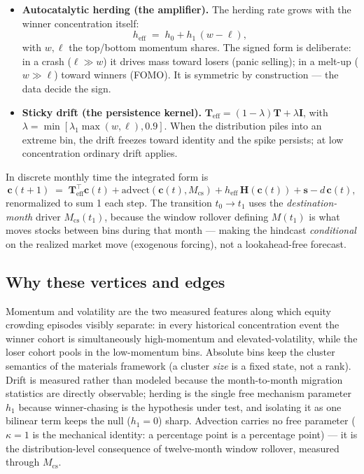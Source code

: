 \documentclass[11pt,a4paper]{article}
\begin{document}
\begin{itemize}
    $f=\kappa|M_{\mathrm{cs}}|/w_{\mathrm{eff}}$ of each momentum bin to
    the next ($\kappa=1.0$ mechanical, $w_{\mathrm{eff}}=0.15$ assumed);
    the unbounded extreme bins ($<0\%$, $>60\%$) reflect and accumulate
    mass --- this is what generates spikes.
  \item \textbf{Autocatalytic herding (the amplifier).} The herding rate
    grows with the winner concentration itself:
    \begin{equation}
      h_{\mathrm{eff}} \;=\; h_0 + h_1\,(w - \ell),
      \label{eq:autoherd}
    \end{equation}
    with $w,\ell$ the top/bottom momentum shares.  The signed form is
    deliberate: in a crash ($\ell\gg w$) it drives mass toward losers
    (panic selling); in a melt-up ($w\gg\ell$) toward winners (FOMO).
    It is symmetric by construction --- the data decide the sign.
  \item \textbf{Sticky drift (the persistence kernel).}
    $\mathbf{T}_{\mathrm{eff}}=(1-\lambda)\mathbf{T}+\lambda\mathbf{I}$,
    with $\lambda=\min[\lambda_1\max(w,\ell),0.9]$.  When the distribution
    piles into an extreme bin, the drift freezes toward identity and the
    spike persists; at low concentration ordinary drift applies.
\end{itemize}
In discrete monthly time the integrated form is
\begin{equation}
  \mathbf{c}(t{+}1) \;=\; \mathbf{T}_{\mathrm{eff}}^{\!\top}\mathbf{c}(t)
  + \mathrm{advect}(\mathbf{c}(t), M_{\mathrm{cs}})
  + h_{\mathrm{eff}}\,\mathbf{H}(\mathbf{c}(t)) + \mathbf{s} - d\,\mathbf{c}(t),
  \label{eq:discrete}
\end{equation}
renormalized to sum 1 each step.  The transition $t_0\to t_1$ uses the
\emph{destination-month} driver $M_{\mathrm{cs}}(t_1)$, because the window
rollover defining $M(t_1)$ is what moves stocks between bins during that
month --- making the hindcast \emph{conditional} on the realized market
move (exogenous forcing), not a lookahead-free forecast.

\subsection{Why these vertices and edges}
Momentum and volatility are the two measured features along which equity
crowding episodes visibly separate: in every historical concentration event
the winner cohort is simultaneously high-momentum and elevated-volatility,
while the loser cohort pools in the low-momentum bins.  Absolute bins keep
the cluster semantics of the materials framework (a cluster \emph{size} is a
fixed state, not a rank).  Drift is measured rather than modeled because the
month-to-month migration statistics are directly observable; herding is the
single free mechanism parameter $h_1$ because winner-chasing is the
hypothesis under test, and isolating it as one bilinear term keeps the null
($h_1=0$) sharp.  Advection carries no free parameter ($\kappa=1$ is the
mechanical identity: a percentage point is a percentage point) --- it is the
distribution-level consequence of twelve-month window rollover, measured
through $M_{\mathrm{cs}}$.
\end{document}
